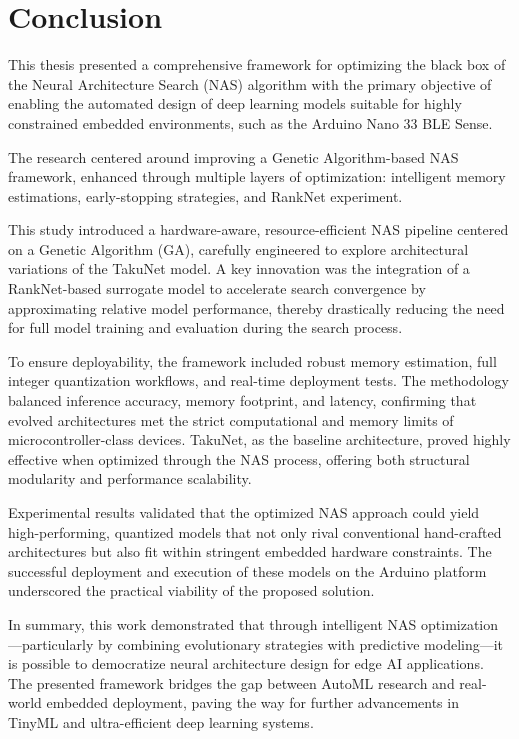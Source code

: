 \chapter{Conclusion}

This thesis presented a comprehensive framework for optimizing the black box of the Neural Architecture Search (NAS) algorithm with the primary objective of enabling the automated design of deep learning models suitable for highly constrained embedded environments, such as the Arduino Nano 33 BLE Sense.

The research centered around improving a Genetic Algorithm-based NAS framework, enhanced through multiple layers of optimization: intelligent memory estimations, early-stopping strategies, and RankNet experiment.

This study introduced a hardware-aware, resource-efficient NAS pipeline centered on a Genetic Algorithm (GA), carefully engineered to explore architectural variations of the TakuNet model. A key innovation was the integration of a RankNet-based surrogate model to accelerate search convergence by approximating relative model performance, thereby drastically reducing the need for full model training and evaluation during the search process.

To ensure deployability, the framework included robust memory estimation, full integer quantization workflows, and real-time deployment tests. The methodology balanced inference accuracy, memory footprint, and latency, confirming that evolved architectures met the strict computational and memory limits of microcontroller-class devices. TakuNet, as the baseline architecture, proved highly effective when optimized through the NAS process, offering both structural modularity and performance scalability.

Experimental results validated that the optimized NAS approach could yield high-performing, quantized models that not only rival conventional hand-crafted architectures but also fit within stringent embedded hardware constraints. The successful deployment and execution of these models on the Arduino platform underscored the practical viability of the proposed solution.

In summary, this work demonstrated that through intelligent NAS optimization—particularly by combining evolutionary strategies with predictive modeling—it is possible to democratize neural architecture design for edge AI applications. The presented framework bridges the gap between AutoML research and real-world embedded deployment, paving the way for further advancements in TinyML and ultra-efficient deep learning systems.




